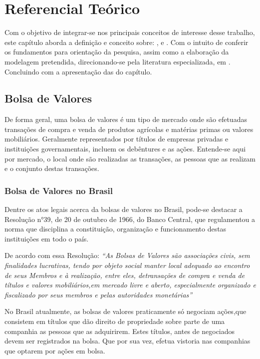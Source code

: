 
\chapter[Referencial Teórico]{Referencial Teórico}

Com o objetivo de integrar-se nos principais conceitos de interesse desse trabalho, este capítulo aborda a definição e conceito sobre: ,  e . Com o intuito de conferir os fundamentos para orientação da pesquisa, assim como a elaboração da modelagem pretendida, direcionando-se pela literatura especializada, em . Concluindo com a apresentação das  do capítulo. 

\section{Bolsa de Valores}
\label{mac}

De forma geral, uma bolsa de valores é um tipo de mercado onde são efetuadas transações de compra e venda de produtos agrícolas e matérias primas ou valores mobiliários. Geralmente representados por títulos de empresas privadas e instituições governamentais, incluem os debêntures e as ações. Entende-se aqui por mercado, o local onde são realizadas as transações, as pessoas que as realizam e o conjunto destas transações. \cite{bolsaValores}

\subsection{Bolsa de Valores no Brasil}

Dentre os atos legais acerca da bolsas de valores no Brasil, pode-se destacar a Resolução n°39, de 20 de outubro de  1966, do Banco Central,  que regulamentou a norma que disciplina a constituição, organização  e funcionamento destas instituições em todo o país. \cite{bolsaValores}

De acordo com essa Resolução: \emph{“As Bolsas de Valores são associações civis, sem finalidades lucrativas, tendo por objeto social manter local adequado ao encontro  de  seus  Membros e à realização, entre eles, detransações de compra e venda de títulos e valores mobiliários,em  mercado livre e aberto, especialmente organizado e fiscalizado por seus membros e pelas autoridades monetárias”}\cite{bolsaValores}

No Brasil atualmente, as bolsas de valores praticamente só negociam ações,que consistem em títulos que dão direito de propriedade sobre parte de uma companhia as pessoas que as adquirirem. Estes títulos, antes de negociados devem  ser registrados na bolsa. Que por sua  vez, efetua vistoria nas companhias que optarem por ações em bolsa. \cite{bolsaValores}

